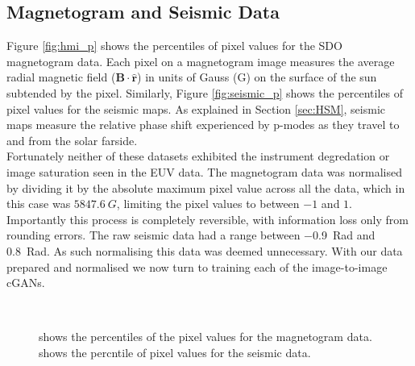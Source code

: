 \documentclass[11pt,a4paper,onecolumn]{report}
\begin{document}
\subsection{Magnetogram and Seismic Data}
Figure \ref{fig:hmi_p} shows the percentiles of pixel values for the SDO
magnetogram data. Each pixel on a magnetogram image measures the average radial
magnetic field ($\mathbf{B}\cdot\mathbf{\hat{r}}$) in units of Gauss (G) on the
surface of the sun subtended by the pixel. Similarly, Figure \ref{fig:seismic_p}
shows the percentiles of pixel values for the seismic maps. As explained in
Section \ref{sec:HSM}, seismic maps measure the relative phase shift experienced
by p-modes as they travel to and from the solar farside. \\

Fortunately neither of these datasets exhibited the instrument degredation or
image saturation seen in the EUV data. The magnetogram data was normalised by
dividing it by the absolute maximum pixel value across all the data, which in
this case was $\SI[]{5847.6}[]{G}$, limiting the pixel values to between $-1$
and $1$. Importantly this process is completely reversible, with information
loss only from rounding errors. The raw seismic data had a range between
\SI{-0.9}{Rad} and \SI{0.8}{Rad}. As such normalising this data was deemed
unnecessary. %
With our data prepared and normalised we now turn to training each of the
image-to-image cGANs.

\begin{figure}[t]%
  \\
  \caption[]{ shows the percentiles of the pixel values for
  the magnetogram data.  shows the percntile of pixel
  values for the seismic data.}
  \label{fig:hmi_seismic_p}
\end{figure}
\end{document}
